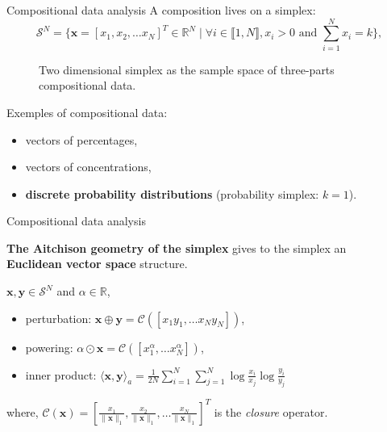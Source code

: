 \documentclass{beamer}
\renewcommand{\footnotesize}{\scriptsize}
\begin{document}
\begin{frame}{Compositional data analysis}
  A composition lives on a simplex:
    \vspace{-0.3cm}
    \begin{equation}
      \mathcal{S}^N = \Big\{ \bm{x} = [x_1, x_2,\dots x_{N}]^T \in \mathbb{R}^N \mid \forall i\in\llbracket 1,N \rrbracket, x_i>0 \text{~and~} \sum_{i=1}^{N} x_i = k \Big\},
    \end{equation}
    \vspace{-0.3cm}
    \begin{minipage}{0.53\textwidth}
      \begin{figure}
        \centering
        
        \caption{Two dimensional simplex as the sample space of three-parts compositional data.}
      \end{figure}
    \end{minipage}
    \begin{minipage}{0.45\textwidth}
  Exemples of compositional data:
  \begin{itemize}
  \item vectors of percentages,
  \item vectors of concentrations,
  \item \textbf{discrete probability distributions} (probability simplex: $k=1$).
    \end{itemize}
    \end{minipage}    
\end{frame}
  
\begin{frame}{Compositional data analysis}
  \begin{center}
    {\large
      \textbf{The Aitchison geometry of the simplex} gives to the simplex an\\
      \textbf{Euclidean vector space} structure.
    } \\
  \end{center}
  \vspace{0.5cm}
  {\footnotesize
    $\bm{x},\bm{y} \in \mathcal{S}^N$ and $\alpha \in \mathbb{R}$,
  \begin{itemize}
\item perturbation: $\bm{x}\oplus \bm{y} = \mathcal{C}\left([x_1y_1,\dots x_{N}y_{N}]\right)$,
    \item powering: $\alpha \odot \bm{x} = \mathcal{C}\left([x_{1}^{\alpha},\dots x_{N}^{\alpha}]\right)$,
    \item inner product: $\displaystyle \langle \bm{x},\bm{y} \rangle_a = \frac{1}{2N}\sum_{i=1}^{N} \sum_{j=1}^{N} \log \frac{x_i}{x_j}\log \frac{y_i}{y_j}$
  \end{itemize}
  where, $\mathcal{C}\left(\bm{x} \right) = \left[ \frac{x_1}{\lVert \bm{x} \rVert_1}, \frac{x_2}{\lVert \bm{x} \rVert_1} ,\dots \frac{x_N}{\lVert \bm{x} \rVert_1} \right]^T$ is the \emph{closure} operator.
  }
\end{frame}
\end{document}
